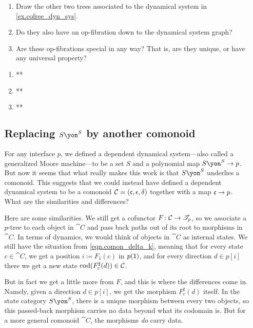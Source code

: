 \documentclass[Book-Poly]{subfiles}
\begin{document}
\begin{exercise}
\begin{enumerate}
	\item Draw the other two trees associated to the dynamical system in \cref{ex.cofree_dyn_sys}.
	\item Do they also have an op-fibration down to the dynamical system graph?
	\item Are these op-fibrations special in any way? That is, are they unique, or have any universal property?
\qedhere
\end{enumerate}
\begin{solution}
\begin{enumerate}
    \item **
    \item **
    \item **
\end{enumerate}
\end{solution}
\end{exercise}

\subsection{Replacing $S\yon^S$ by another comonoid}

For any interface $p$, we defined a dependent dynamical system---also called a generalized Moore machine---to be a set $S$ and a polynomial map $S\yon^S\to p$. But now it seems that what really makes this work is that $S\yon^S$ underlies a comonoid. This suggests that we could instead have defined a dependent dynamical system to be a comonoid $\mathcal{C}=(\mathfrak{c},\epsilon,\delta)$ together with a map $\mathfrak{c}\to p$. What are the similarities and differences?

Here are some similarities. We still get a cofunctor $F\colon\mathcal{C}\to\mathscr{T}_{p}$, so we associate a $p$-tree to each object in $\cat{C}$ and pass back paths out of its root to morphisms in $\cat{C}$. In terms of dynamics, we would think of objects in $\cat{C}$ as internal states. We still have the situation from \eqref{eqn.comon_delta_k}, meaning that for every state $c\in\cat{C}$, we get a position $i\coloneqq F_1(c)$ in $p(\textsf{1})$, and for every direction $d\in p[i]$ there we get a new state $\operatorname{cod}(F^\sharp_c(d))\in\mathcal{C}$. 

But in fact we get a little more from $F$, and this is where the differences come in. Namely, given a direction $d\in p[i]$, we get the morphism $F^\sharp_c(d)$ itself. In the state category $S\yon^S$, there is a unique morphism between every two objects, so this passed-back morphism carries no data beyond what its codomain is. But for a more general comonoid $\cat{C}$, the morphisms \emph{do} carry data. 
\end{document}

